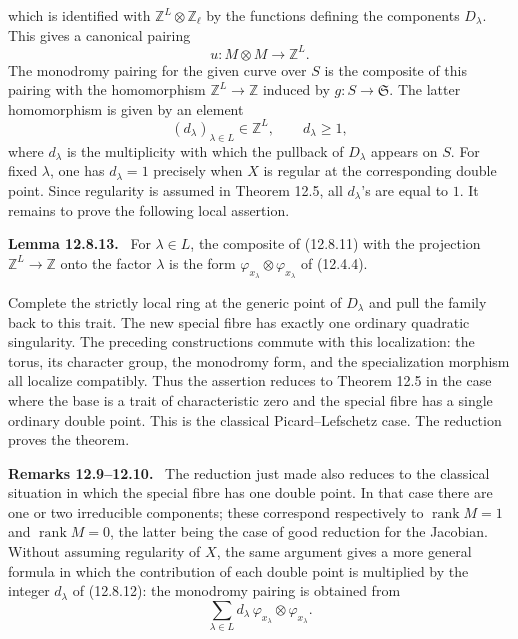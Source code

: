 \documentclass[11pt]{article}
\providecommand{\rank}{\operatorname{rank}}
\providecommand{\Z}{\mathbb Z}
\newenvironment{statement}[1]{\par\medskip\noindent\textbf{#1.}\ }{\par\medskip}
\newenvironment{remarktext}[1]{\par\medskip\noindent\textbf{#1.}\ }{\par\medskip}
\begin{document}
which is identified with \(\Z^L\otimes\Z_\ell\) by the functions defining the components \(D_\lambda\).  This gives a canonical pairing
\begin{equation}\tag{12.8.11}
        u: M\otimes M\longrightarrow\Z^L.
\end{equation}
The monodromy pairing for the given curve over \(S\) is the composite of this pairing with the homomorphism \(\Z^L\to\Z\) induced by \(g:S\to\mathfrak S\).  The latter homomorphism is given by an element
\begin{equation}\tag{12.8.12}
        (d_\lambda)_{\lambda\in L}\in\Z^L,
        \qquad d_\lambda\geq 1,
\end{equation}
where \(d_\lambda\) is the multiplicity with which the pullback of \(D_\lambda\) appears on \(S\).  For fixed \(\lambda\), one has \(d_\lambda=1\) precisely when \(X\) is regular at the corresponding double point.  Since regularity is assumed in Theorem 12.5, all \(d_\lambda\)'s are equal to \(1\).  It remains to prove the following local assertion.

\begin{statement}{Lemma 12.8.13}
For \(\lambda\in L\), the composite of (12.8.11) with the projection \(\Z^L\to\Z\) onto the factor \(\lambda\) is the form \(\varphi_{x_\lambda}\otimes\varphi_{x_\lambda}\) of (12.4.4).
\end{statement}

Complete the strictly local ring at the generic point of \(D_\lambda\) and pull the family back to this trait.  The new special fibre has exactly one ordinary quadratic singularity.  The preceding constructions commute with this localization: the torus, its character group, the monodromy form, and the specialization morphism all localize compatibly.  Thus the assertion reduces to Theorem 12.5 in the case where the base is a trait of characteristic zero and the special fibre has a single ordinary double point.  This is the classical Picard--Lefschetz case.  The reduction proves the theorem.

\begin{remarktext}{Remarks 12.9--12.10}
The reduction just made also reduces to the classical situation in which the special fibre has one double point.  In that case there are one or two irreducible components; these correspond respectively to \(\rank M=1\) and \(\rank M=0\), the latter being the case of good reduction for the Jacobian.  Without assuming regularity of \(X\), the same argument gives a more general formula in which the contribution of each double point is multiplied by the integer \(d_\lambda\) of (12.8.12): the monodromy pairing is obtained from
\begin{equation}\tag{12.10.1}
        \sum_{\lambda\in L}d_\lambda\,
        \varphi_{x_\lambda}\otimes\varphi_{x_\lambda}.
\end{equation}
\end{remarktext}
\end{document}
